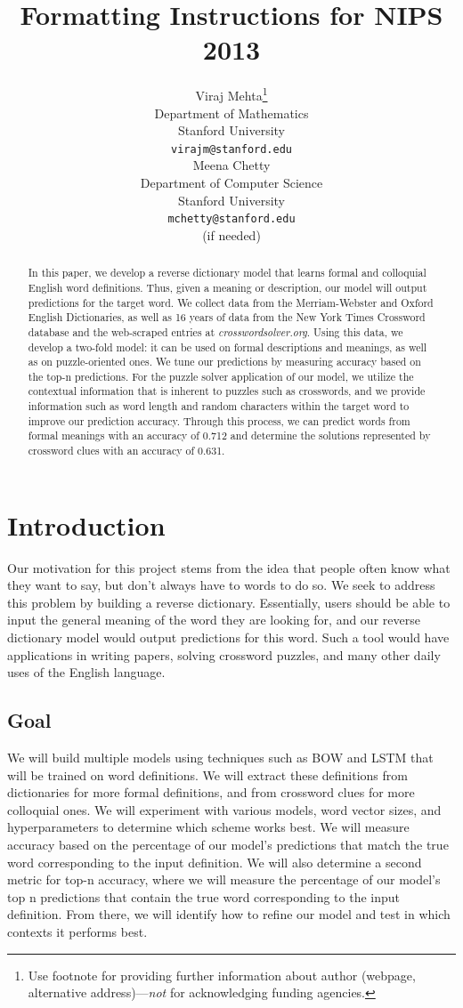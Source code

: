 \documentclass{article} %
\title{Formatting Instructions for NIPS 2013}
\author{
Viraj Mehta\thanks{ Use footnote for providing further information
about author (webpage, alternative address)---\emph{not} for acknowledging
funding agencies.} \\
Department of Mathematics\\
Stanford University\\
\texttt{virajm@stanford.edu} \\
\And
Meena Chetty \\
Department of Computer Science \\
Stanford University \\
\texttt{mchetty@stanford.edu} \\
(if needed)\\
}
\begin{document}
\maketitle

\begin{abstract}
In this paper, we develop a reverse dictionary model that learns formal and colloquial English word definitions. Thus, given a meaning or description, our model will output predictions for the target word. We collect data from the Merriam-Webster and Oxford English Dictionaries, as well as 16 years of data from the New York Times Crossword database and the web-scraped entries at \emph{crosswordsolver.org}. Using this data, we develop a two-fold model: it can be used on formal descriptions and meanings, as well as on puzzle-oriented ones. We tune our predictions by measuring accuracy based on the top-n predictions. For the puzzle solver application of our model, we utilize the contextual information that is inherent to puzzles such as crosswords, and we provide information such as word length and random characters within the target word to improve our prediction accuracy. Through this process, we can predict words from formal meanings with an accuracy of 0.712 and determine the solutions represented by crossword clues with an accuracy of 0.631.
\end{abstract}


\section{Introduction}
Our motivation for this project stems from the idea that people often know what they want to say, but don’t always have to words to do so. We seek to address this problem by building a reverse dictionary. Essentially, users should be able to input the general meaning of the word they are looking for, and our reverse dictionary model would output predictions for this word. Such a tool would have applications in writing papers, solving crossword puzzles, and many other daily uses of the English language.

\subsection{Goal}
We will build multiple models using techniques such as BOW and LSTM that will be trained on word definitions. We will extract these definitions from dictionaries for more formal definitions, and from crossword clues for more colloquial ones. We will experiment with various models, word vector sizes, and hyperparameters to determine which scheme works best. We will measure accuracy based on the percentage of our model’s predictions that match the true word corresponding to the input definition. We will also determine a second metric for top-n accuracy, where we will measure the percentage of our model’s top n predictions that contain the true word corresponding to the input definition. From there, we will identify how to refine our model and test in which contexts it performs best.
\end{document}
